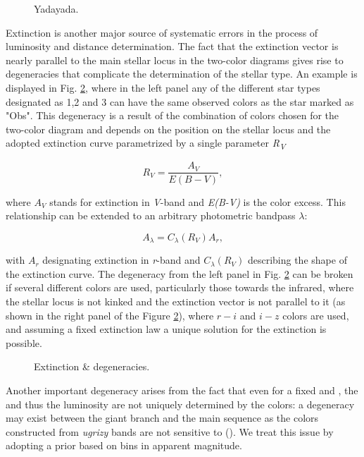 \begin{figure}[ht!]
	\caption{Yadayada. \label{fig:metallicity}}
\end{figure}

Extinction is another major source of systematic errors in the process of luminosity and distance determination. The fact that the extinction vector is nearly parallel to the main stellar locus in the two-color diagrams gives rise to degeneracies that complicate the determination of the stellar type. An example is displayed in Fig. \ref{fig:degeneracies}, where in the left panel any of the different star types designated as 1,2 and 3 can have the same observed colors as the star marked as "Obs". This degeneracy is a result of the combination of colors chosen for the two-color diagram and depends on the position on the stellar locus and the adopted extinction curve parametrized by a single parameter \textit{R\textsubscript{V}}

\begin{equation}
	R_V = \frac{A_V}{E(B-V)},
\end{equation}

where $A_V$ stands for extinction in \textit{V}-band and \textit{E(B-V)} is the color excess. This relationship can be extended to an arbitrary photometric bandpass $\lambda$:

\begin{equation}
	A_{\lambda} = C_{\lambda}(R_V)A_r,
\end{equation}

with $A_r$ designating extinction in \textit{r}-band and $C_{\lambda}(R_V)$ describing the shape of the extinction curve. The degeneracy from the left panel in Fig. \ref{fig:degeneracies} can be broken if several different colors are used, particularly those towards the infrared, where the stellar locus is not kinked and the extinction vector is not parallel to it (as shown in the right panel of the Figure \ref{fig:degeneracies}), where $r-i$ and $i-z$ colors are used, and assuming a fixed extinction law a unique solution for the extinction is possible. 



\begin{figure}[ht!]
	\caption{Extinction \& degeneracies. \label{fig:degeneracies}}
\end{figure}

Another important degeneracy arises from the fact that even for a fixed \teff and \mh, the \logg and thus the luminosity are not uniquely determined by the colors: a degeneracy may exist between the giant branch and the main sequence as the colors constructed from \textit{ugrizy} bands are not sensitive to \logg (). We treat this issue by adopting a prior based on bins in apparent magnitude.

